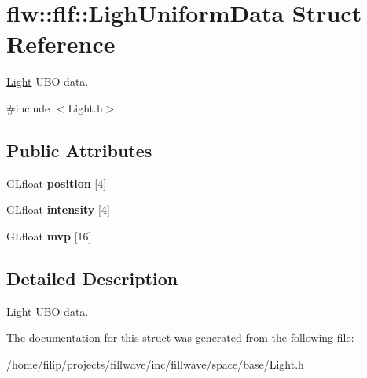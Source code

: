 \hypertarget{structflw_1_1flf_1_1LighUniformData}{}\section{flw\+:\+:flf\+:\+:Ligh\+Uniform\+Data Struct Reference}
\label{structflw_1_1flf_1_1LighUniformData}


\hyperlink{classflw_1_1flf_1_1Light}{Light} U\+BO data.  




{\ttfamily \#include $<$Light.\+h$>$}

\subsection*{Public Attributes}
\begin{DoxyCompactItemize}
\item 
\mbox{\label{structflw_1_1flf_1_1LighUniformData_a0e24770ef4654e1958bb998b1357fec9}} 
G\+Lfloat {\bfseries position} \mbox{[}4\mbox{]}
\item 
\mbox{\label{structflw_1_1flf_1_1LighUniformData_ae25d583436db813a6e006c99da7cb4e2}} 
G\+Lfloat {\bfseries intensity} \mbox{[}4\mbox{]}
\item 
\mbox{\label{structflw_1_1flf_1_1LighUniformData_a61bc7a687ba50d3474faff5d02992754}} 
G\+Lfloat {\bfseries mvp} \mbox{[}16\mbox{]}
\end{DoxyCompactItemize}


\subsection{Detailed Description}
\hyperlink{classflw_1_1flf_1_1Light}{Light} U\+BO data. 

The documentation for this struct was generated from the following file\+:\begin{DoxyCompactItemize}
\item 
/home/filip/projects/fillwave/inc/fillwave/space/base/Light.\+h\end{DoxyCompactItemize}
